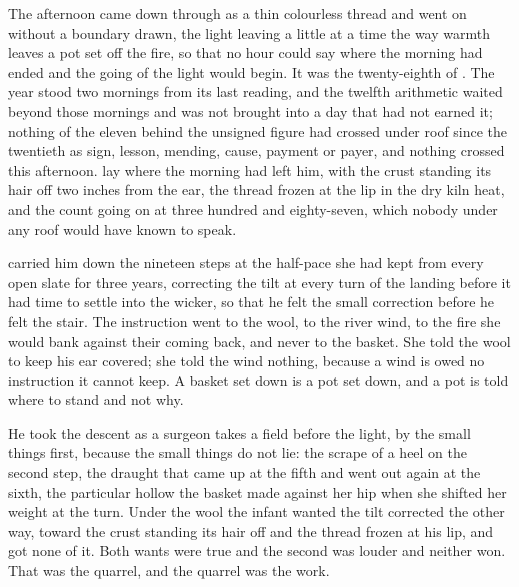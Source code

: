 The afternoon came down through  as a thin colourless thread and went on without a boundary drawn, the light leaving  a little at a time the way warmth leaves a pot set off the fire, so that no hour could say where the morning had ended and the going of the light would begin. It was the twenty-eighth of . The year stood two mornings from its last reading, and the twelfth arithmetic waited beyond those mornings and was not brought into a day that had not earned it; nothing of the eleven behind the unsigned figure had crossed under  roof since the twentieth as sign, lesson, mending, cause, payment or payer, and nothing crossed this afternoon.  lay where the morning had left him, with the crust standing its hair off two inches from the ear, the thread frozen at the lip in the dry kiln heat, and the count going on at three hundred and eighty-seven, which nobody under any roof would have known to speak.

 carried him down the nineteen steps at the half-pace she had kept from every open slate for three years, correcting the tilt at every turn of the landing before it had time to settle into the wicker, so that he felt the small correction before he felt the stair. The instruction went to the wool, to the river wind, to the fire she would bank against their coming back, and never to the basket. She told the wool to keep his ear covered; she told the wind nothing, because a wind is owed no instruction it cannot keep. A basket set down is a pot set down, and a pot is told where to stand and not why.

He took the descent as a surgeon takes a field before the light, by the small things first, because the small things do not lie: the scrape of a heel on the second step, the draught that came up at the fifth and went out again at the sixth, the particular hollow the basket made against her hip when she shifted her weight at the turn. Under the wool the infant wanted the tilt corrected the other way, toward the crust standing its hair off and the thread frozen at his lip, and got none of it. Both wants were true and the second was louder and neither won. That was the quarrel, and the quarrel was the work.

